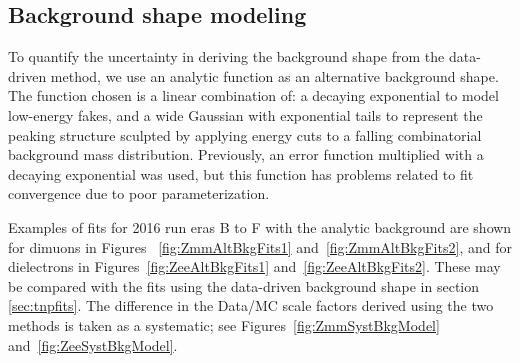 {\subsection{Background shape modeling}
To quantify the uncertainty in deriving the background shape from the data-driven method,
we use an analytic function as an alternative background shape.
The function chosen is a linear combination of: a decaying exponential to model low-energy fakes,
and a wide Gaussian with exponential tails to represent the peaking structure
sculpted by applying energy cuts to a falling combinatorial background mass distribution.
Previously, an error function multiplied with a decaying exponential was used, but this function
has problems related to fit convergence due to poor parameterization.

Examples of fits for 2016 run eras B to F with the analytic background are shown for dimuons in
Figures ~\ref{fig:ZmmAltBkgFits1} and~\ref{fig:ZmmAltBkgFits2}, 
and for dielectrons in Figures~\ref{fig:ZeeAltBkgFits1} and~\ref{fig:ZeeAltBkgFits2}.
These may be compared with the fits using the data-driven background shape 
in section \ref{sec:tnpfits}.
The difference in the Data/MC scale factors derived using the two methods is taken as a systematic; 
see Figures~\ref{fig:ZmmSystBkgModel} and~\ref{fig:ZeeSystBkgModel}.

}
